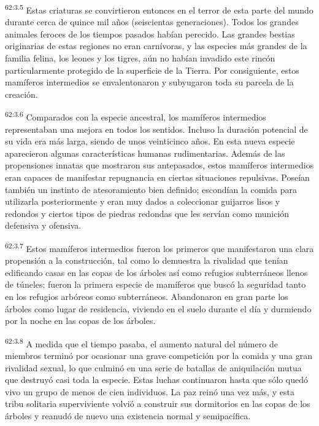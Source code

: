 \par
\textsuperscript{62:3.5} Estas criaturas se convirtieron entonces en el terror de esta parte del mundo durante cerca de quince mil años (seiscientas generaciones). Todos los grandes animales feroces de los tiempos pasados habían perecido. Las grandes bestias originarias de estas regiones no eran carnívoras, y las especies más grandes de la familia felina, los leones y los tigres, aún no habían invadido este rincón particularmente protegido de la superficie de la Tierra. Por consiguiente, estos mamíferos intermedios se envalentonaron y subyugaron toda su parcela de la creación.

\par
\textsuperscript{62:3.6} Comparados con la especie ancestral, los mamíferos intermedios representaban una mejora en todos los sentidos. Incluso la duración potencial de su vida era más larga, siendo de unos veinticinco años. En esta nueva especie aparecieron algunas características humanas rudimentarias. Además de las propensiones innatas que mostraron sus antepasados, estos mamíferos intermedios eran capaces de manifestar repugnancia en ciertas situaciones repulsivas. Poseían también un instinto de atesoramiento bien definido; escondían la comida para utilizarla posteriormente y eran muy dados a coleccionar guijarros lisos y redondos y ciertos tipos de piedras redondas que les servían como munición defensiva y ofensiva.

\par
\textsuperscript{62:3.7} Estos mamíferos intermedios fueron los primeros que manifestaron una clara propensión a la construcción, tal como lo demuestra la rivalidad que tenían edificando casas en las copas de los árboles así como refugios subterráneos llenos de túneles; fueron la primera especie de mamíferos que buscó la seguridad tanto en los refugios arbóreos como subterráneos. Abandonaron en gran parte los árboles como lugar de residencia, viviendo en el suelo durante el día y durmiendo por la noche en las copas de los árboles.

\par
\textsuperscript{62:3.8} A medida que el tiempo pasaba, el aumento natural del número de miembros terminó por ocasionar una grave competición por la comida y una gran rivalidad sexual, lo que culminó en una serie de batallas de aniquilación mutua que destruyó casi toda la especie. Estas luchas continuaron hasta que sólo quedó vivo un grupo de menos de cien individuos. La paz reinó una vez más, y esta tribu solitaria superviviente volvió a construir sus dormitorios en las copas de los árboles y reanudó de nuevo una existencia normal y semipacífica.

